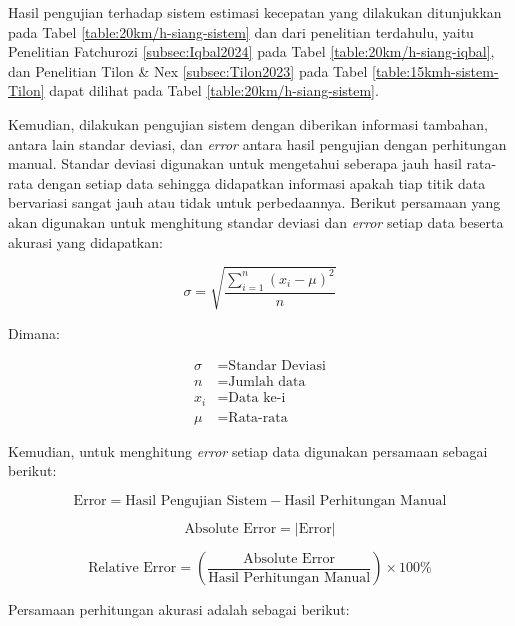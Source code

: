 Hasil pengujian terhadap sistem estimasi kecepatan yang dilakukan ditunjukkan pada Tabel \ref{table:20km/h-siang-sistem} dan dari penelitian terdahulu, yaitu Penelitian Fatchurozi \ref{subsec:Iqbal2024} pada Tabel \ref{table:20km/h-siang-iqbal}, dan Penelitian Tilon \& Nex \ref{subsec:Tilon2023} pada Tabel \ref{table:15kmh-sistem-Tilon} dapat dilihat pada Tabel \ref{table:20km/h-siang-sistem}.

Kemudian, dilakukan pengujian sistem dengan diberikan informasi tambahan, antara lain standar deviasi, dan \emph{error} antara hasil pengujian dengan perhitungan manual. Standar deviasi digunakan untuk mengetahui seberapa jauh hasil rata-rata dengan setiap data sehingga didapatkan informasi apakah tiap titik data bervariasi sangat jauh atau tidak untuk perbedaannya. Berikut persamaan yang akan digunakan untuk menghitung standar deviasi dan \emph{error} setiap data beserta akurasi yang didapatkan:

\begin{equation}
\sigma = \sqrt{\frac{\sum_{i=1}^n (x_i - \mu)^2}{n}} \label{eq:standardeviasi}
\end{equation}

Dimana:

\[
\begin{aligned}
\sigma & = \text{Standar Deviasi} \\
n & = \text{Jumlah data} \\
x_i & = \text{Data ke-i} \\
\mu & = \text{Rata-rata}
\end{aligned}
\]

Kemudian, untuk menghitung \emph{error} setiap data digunakan persamaan sebagai berikut:

\begin{equation}
\text{Error} = \text{Hasil Pengujian Sistem} - \text{Hasil Perhitungan Manual} \label{eq:error}
\end{equation}

\begin{equation}
\text{Absolute Error} = \left| \text{Error} \right| \label{eq:absolute_error}
\end{equation}

\begin{equation}
\text{Relative Error} = \left( \frac{\text{Absolute Error}}{\text{Hasil Perhitungan Manual}} \right) \times 100\% \label{eq:relative_error}
\end{equation}

Persamaan perhitungan akurasi adalah sebagai berikut:

